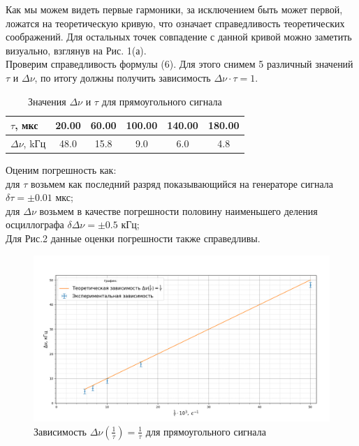 \documentclass[a4paper, 12pt]{article}%
\begin{document}
	Как мы можем видеть первые гармоники, за исключением быть может первой, ложатся на теоретическую кривую, что означает справедливость теоретических соображений. Для остальных точек совпадение с данной кривой можно заметить визуально, взглянув на Рис. 1(а).\\
	Проверим справедливость формулы (6). Для этого снимем 5 различный значений $\tau$ и $\Delta \nu$, по итогу должны получить зависимость $\Delta \nu \cdot \tau = 1$.
	\begin{table}[H]
		\centering
		\begin{tabular}{|l|c|c|c|c|c|}
			\hline
			$\tau$, мкс        & 20.00   & 60.00   & 100.00&  140.00 & 180.00 \\ \hline
			$\Delta \nu$, kГц & 48.0 & 15.8 & 9.0 & 6.0 & 4.8 \\ \hline
		\end{tabular}
	\caption{Значения $\Delta \nu$ и $\tau$ для прямоугольного сигнала}
	\end{table}
	Оценим погрешность как:\\
	для $\tau$ возьмем как последний разряд показывающийся на генераторе сигнала $\delta \tau = \pm 0.01$ мкс;\\
	для $\Delta \nu$ возьмем в качестве погрешности половину наименьшего деления  осциллографа $\delta \Delta \nu = \pm 0.5$ кГц;\\
	Для Рис.2 данные оценки погрешности также справедливы.
	\begin{figure}[H]
		\centering
		\includegraphics[width=0.9\linewidth]{завис_1}
		\caption{Зависимость $\Delta \nu(\frac{1}{\tau}) = \frac{1}{\tau}$ для прямоугольного сигнала}
		\label{fig:1}
	\end{figure}
\end{document}
